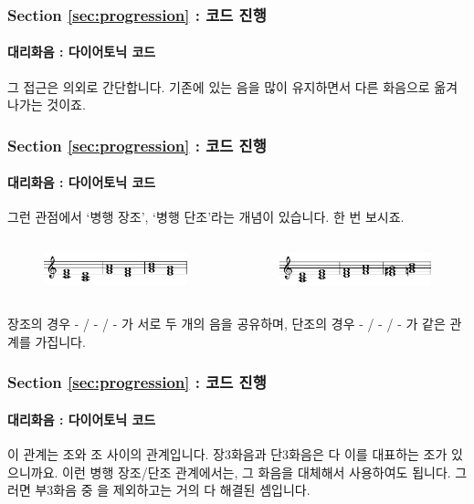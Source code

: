 \documentclass{beamer}
\newcommand{\Rn}[1]{%
	\textup{\uppercase\expandafter{\romannumeral#1}}%
}
\newcommand{\rn}[1]{%
	\textup{\lowercase\expandafter{\romannumeral#1}}%
}
\begin{document}
	\begin{frame}
		\frametitle{Section \ref{sec:progression} : 코드 진행}
		\framesubtitle{대리화음 : 다이어토닉 코드}
		그 접근은 의외로 간단합니다. 기존에 있는 음을 많이 유지하면서 다른 화음으로 옮겨나가는 것이죠.
	\end{frame}
	
	\begin{frame}
		\frametitle{Section \ref{sec:progression} : 코드 진행}
		\framesubtitle{대리화음 : 다이어토닉 코드}
		그런 관점에서 `병행 장조', `병행 단조'라는 개념이 있습니다. 한 번 보시죠.
		\begin{columns}
			\begin{column}{0.4\textwidth}
				\begin{figure}
					\centering
					\includegraphics[width=\columnwidth]{res/pdf/11/progression/substitute_major_1.pdf}
				\end{figure}
				
			\end{column}
			\begin{column}{0.4\textwidth}
				\begin{figure}
					\centering
					\includegraphics[width=\columnwidth]{res/pdf/11/progression/substitute_minor_1.pdf}
				\end{figure}
			\end{column}
		\end{columns}
		\vskip 1.5pc
		장조의 경우 \Rn{1}-\rn{6} / \Rn{4}-\rn{2} / \Rn{5}-\rn{3}가 서로 두 개의 음을 공유하며, 단조의 경우 \rn{1}-\Rn{3} / \rn{4}-\Rn{6} / \Rn{5}-\Rn{7}가 같은 관계를 가집니다.
	\end{frame}
	
	\begin{frame}
		\frametitle{Section \ref{sec:progression} : 코드 진행}
		\framesubtitle{대리화음 : 다이어토닉 코드}
		이 관계는 조와 조 사이의 관계입니다. 장3화음과 단3화음은 다 이를 대표하는 조가 있으니까요. 이런 병행 장조/단조 관계에서는, 그 화음을 대체해서 사용하여도 됩니다. 그러면 부3화음 중 \Rn{7}을 제외하고는 거의 다 해결된 셈입니다.
	\end{frame}
	
\end{document}
